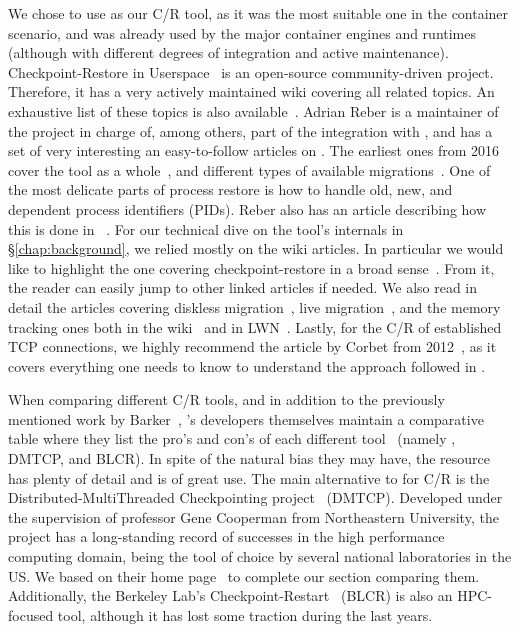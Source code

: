We chose to use \criu as our C/R tool, as it was the most suitable one in the container scenario, and was already used by the major container engines and runtimes (although with different degrees of integration and active maintenance).
Checkpoint-Restore in Userspace~\cite{criu-main-page} is an open-source community-driven project.
Therefore, it has a very actively maintained wiki covering all related topics.
An exhaustive list of these topics is also available~\cite{criu-all}.
Adrian Reber is a maintainer of the project in charge of, among others, part of the integration with \runc, and has a set of very interesting an easy-to-follow articles on \criu.
The earliest ones from 2016 cover the tool as a whole~\cite{Reber2016}, and different types of available migrations~\cite{Reber2016b}.
One of the most delicate parts of process restore is how to handle old, new, and dependent process identifiers (PIDs).
Reber also has an article describing how this is done in \criu~\cite{Reber2019}.
For our technical dive on the tool's internals in \S\ref{chap:background}, we relied mostly on the wiki articles.
In particular we would like to highlight the one covering checkpoint-restore in a broad sense~\cite{criu-checkpoint}.
From it, the reader can easily jump to other linked articles if needed.
We also read in detail the articles covering diskless migration~\cite{criu-diskless}, live migration~\cite{criu-live-migration}, and the memory tracking ones both in the wiki~\cite{criu-memory-tracking} and in LWN~\cite{criu-memory-tracking-lwn}.
Lastly, for the C/R of established TCP connections, we highly recommend the article by Corbet from 2012~\cite{Corbet12}, as it covers everything one needs to know to understand the approach followed in \criu.

When comparing different C/R tools, and in addition to the previously mentioned work by Barker~\cite{Barker2014}, \criu's developers themselves maintain a comparative table where they list the pro's and con's of each different tool~\cite{criu-comparison} (namely \criu, DMTCP, and BLCR).
In spite of the natural bias they may have, the resource has plenty of detail and is of great use.
The main alternative to \criu for C/R is the Distributed-MultiThreaded Checkpointing project~\cite{Ansel2009} (DMTCP).
Developed under the supervision of professor Gene Cooperman from Northeastern University, the project has a long-standing record of successes in the high performance computing domain, being the tool of choice by several national laboratories in the US.
We based on their home page~\cite{dmtcp} to complete our section comparing them.
Additionally, the Berkeley Lab's Checkpoint-Restart~\cite{blcr} (BLCR) is also an HPC-focused tool, although it has lost some traction during the last years. 


